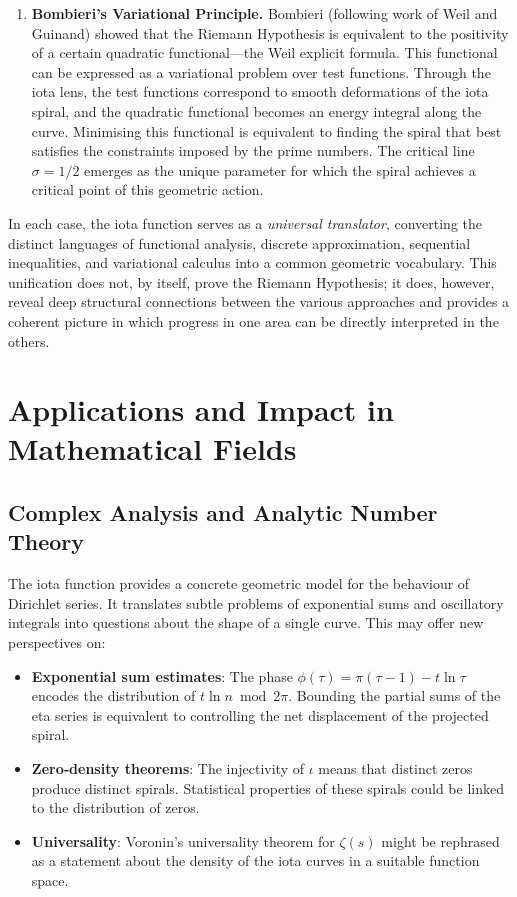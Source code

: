 \documentclass[11pt]{article}
\begin{document}
\begin{enumerate}
  \item \textbf{Bombieri's Variational Principle.}  Bombieri (following work of Weil and Guinand) showed that the Riemann Hypothesis is equivalent to the positivity of a certain quadratic functional—the Weil explicit formula.  This functional can be expressed as a variational problem over test functions.  Through the iota lens, the test functions correspond to smooth deformations of the iota spiral, and the quadratic functional becomes an energy integral along the curve.  Minimising this functional is equivalent to finding the spiral that best satisfies the constraints imposed by the prime numbers.  The critical line $\sigma = 1/2$ emerges as the unique parameter for which the spiral achieves a critical point of this geometric action.
\end{enumerate}

In each case, the iota function serves as a \emph{universal translator}, converting the distinct languages of functional analysis, discrete approximation, sequential inequalities, and variational calculus into a common geometric vocabulary.  This unification does not, by itself, prove the Riemann Hypothesis; it does, however, reveal deep structural connections between the various approaches and provides a coherent picture in which progress in one area can be directly interpreted in the others.

\section{Applications and Impact in Mathematical Fields}

\subsection{Complex Analysis and Analytic Number Theory}
The iota function provides a concrete geometric model for the behaviour of Dirichlet series.  It translates subtle problems of exponential sums and oscillatory integrals into questions about the shape of a single curve.  This may offer new perspectives on:
\begin{itemize}
  \item \textbf{Exponential sum estimates}: The phase $\phi(\tau) = \pi(\tau-1) - t\ln\tau$ encodes the distribution of $t\ln n \bmod 2\pi$.  Bounding the partial sums of the eta series is equivalent to controlling the net displacement of the projected spiral.
  \item \textbf{Zero‑density theorems}: The injectivity of $\iota$ means that distinct zeros produce distinct spirals.  Statistical properties of these spirals could be linked to the distribution of zeros.
  \item \textbf{Universality}: Voronin's universality theorem for $\zeta(s)$ might be rephrased as a statement about the density of the iota curves in a suitable function space.
\end{itemize}
\end{document}
